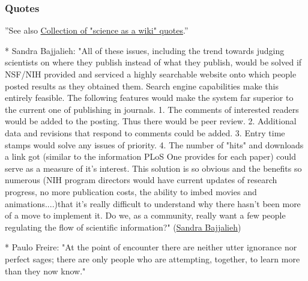 \documentclass[final,authoryear,3p]{elsarticle-open-drafting}
\begin{document}
\subsubsection{Quotes}
''See also \href{http://www.science3point0.com/coaspedia/index.php/User:Daniel_Mietchen/Talks/Slides/Quotes}{Collection of "science as a wiki" quotes}.''

* Sandra Bajjalieh: "All of these issues, including the trend towards judging scientists on where they publish instead of what they publish, would be solved if NSF/NIH provided and serviced a highly searchable website onto which people posted results as they obtained them. Search engine capabilities make this entirely feasible. The following features would make the system far superior to the current one of publishing in journals. 1. The comments of interested readers would be added to the posting. Thus there would be peer review. 2. Additional data and revisions that respond to comments could be added. 3. Entry time stamps would solve any issues of priority. 4. The number of "hits" and downloads a link got (similar to the information PLoS One provides for each paper) could serve as a measure of it's interest. This solution is so obvious and the benefits so numerous (NIH program directors would have current updates of research progress, no more publication costs, the ability to imbed movies and animations....)that it's really difficult to understand why there hasn't been more of a move to implement it. Do we, as a community, really want a few people regulating the flow of scientific information?" (\href{http://www.nature.com/news/2011/110427/full/472391a.html}{Sandra Bajjalieh})

* Paulo Freire: "At the point of encounter there are neither utter ignorance nor perfect sages; there are only people who are attempting, together, to learn more than they now know." 
\end{document}
